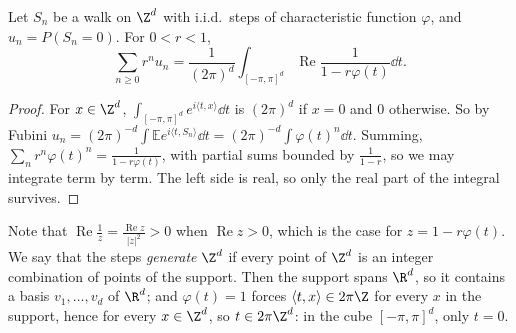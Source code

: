 \begin{lemma}\label{lem:greenfourier}
Let $S_n$ be a walk on $\Z^d$ with i.i.d.\ steps of characteristic function $\varphi$, and $u_n=P(S_n=0)$. For $0<r<1$,
\[
\sum_{n\ge0}r^nu_n=\frac1{(2\pi)^d}\int_{[-\pi,\pi]^d}\operatorname{Re}\frac1{1-r\varphi(t)}\dd t.
\]
\end{lemma}
\begin{proof}
For $x\in\Z^d$, $\int_{[-\pi,\pi]^d}e^{i\langle t,x\rangle}\dd t$ is $(2\pi)^d$ if $x=0$ and $0$ otherwise. So by Fubini $u_n=(2\pi)^{-d}\int\mathbb E e^{i\langle t,S_n\rangle}\dd t=
(2\pi)^{-d}\int\varphi(t)^n\dd t$. Summing, $\sum_nr^n\varphi(t)^n=\frac1{1-r\varphi(t)}$, with partial sums bounded by $\frac1{1-r}$, so we may integrate term
by term. The left side is real, so only the real part of the integral survives.
\end{proof}

Note that $\operatorname{Re}\frac1z=\frac{\operatorname{Re}z}{|z|^2}>0$ when $\operatorname{Re}z>0$, which is the case for $z=1-r\varphi(t)$. We say that the
steps \emph{generate} $\Z^d$ if every point of $\Z^d$ is an integer combination of points of the support. Then the support spans $\R^d$, so it
contains a basis $v_1,\dots,v_d$ of $\R^d$; and $\varphi(t)=1$ forces $\langle t,x\rangle\in2\pi\Z$ for every $x$ in the support, hence for every $x\in\Z^d$, so
$t\in2\pi\Z^d$: in the cube $[-\pi,\pi]^d$, only $t=0$.

